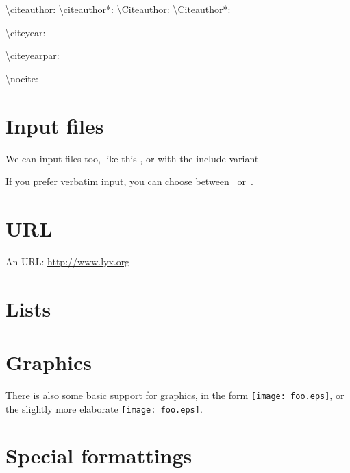 \documentclass[a4paper,12pt]{article}
\begin{document}
\textbackslash{}citeauthor: \citeauthor[before][after]{article-crossref}
\textbackslash{}citeauthor{*}: \citeauthor*[before][after]{article-crossref}
\textbackslash{}Citeauthor: 
\textbackslash{}Citeauthor{*}: 

\textbackslash{}citeyear: \citeyear[before][after]{article-crossref}

\textbackslash{}citeyearpar: \citeyearpar[before][after]{article-crossref} 

\textbackslash{}nocite: \nocite{article-crossref}




\section{Input files}

We can input files too, like this , or with the include
variant 

If you prefer verbatim input, you can choose
between~ or~.

\section{URL}

An URL: \url{http://www.lyx.org}

\section{Lists}

\listoffigures
\listoftables

\section{Graphics}

There is also some basic support for graphics, in the form
\texttt{[image: foo.eps]}, or the slightly more elaborate
\texttt{[image: foo.eps]}.

\section{Special formattings}
\end{document}
